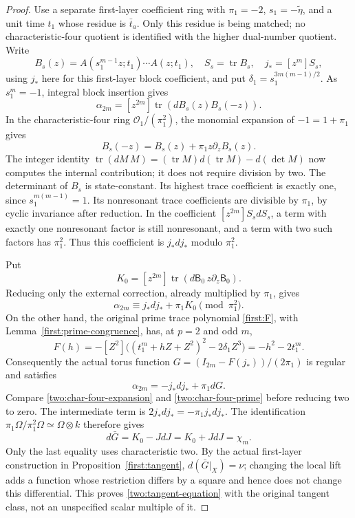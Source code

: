 \begin{proof}
Use a separate first-layer coefficient ring with
$\pi_1=-2$, $s_1=-\widetilde\eta$, and a unit time $t_1$
whose residue is $\bar t_a$. Only this residue is being
matched; no characteristic-four quotient is identified with
the higher dual-number quotient. Write
\[
 B_s(z)=A(s_1^{m-1}z;t_1)\cdots A(z;t_1),\quad
 S_s=\operatorname{tr}B_s,\quad j_*=[z^m]S_s,
\]
using $j_*$ here for this first-layer block coefficient, and put
$\delta_1=s_1^{3m(m-1)/2}$.
As $s_1^m=-1$, integral block insertion gives
\[
 \alpha_{2m}=[z^{2m}]\operatorname{tr}(dB_s(z)B_s(-z)).
\]
In the characteristic-four ring $\mathcal O_1/(\pi_1^2)$,
the monomial expansion of $-1=1+\pi_1$ gives
\[
 B_s(-z)=B_s(z)+\pi_1z\partial_zB_s(z).
\]
The integer identity
$\operatorname{tr}(dM\,M)=(\operatorname{tr}M)d(\operatorname{tr}M)
 -d(\det M)$ now computes the internal contribution; it
does not require division by two. The determinant of $B_s$
is state-constant. Its highest trace coefficient is exactly
one, since $s_1^{m(m-1)}=1$. Its nonresonant trace coefficients
are divisible by $\pi_1$, by cyclic invariance after reduction.
In the coefficient $[z^{2m}]S_s dS_s$, a term with exactly
one nonresonant factor is still nonresonant, and a term with
two such factors has $\pi_1^2$. Thus this coefficient is
$j_*dj_*$ modulo $\pi_1^2$.

Put
\[
 K_0=[z^{2m}]\operatorname{tr}
               (d\mathsf B_0\,z\partial_z\mathsf B_0).
\]
Reducing only the external correction, already multiplied by
$\pi_1$, gives
\begin{equation}
 \alpha_{2m}\equiv j_*dj_*+\pi_1K_0\pmod{\pi_1^2}.
 \label{two:char-four-expansion}
\end{equation}
On the other hand, the original prime trace polynomial
\eqref{first:F}, with Lemma~\ref{first:prime-congruence},
has, at $p=2$ and odd $m$,
\[
 F(h)=-[Z^2]\bigl((t_1^m+hZ+Z^2)^2-2\delta_1Z^3\bigr)
     =-h^2-2t_1^m.
\]
Consequently the actual torus function
$G=(I_{2m}-F(j_*))/(2\pi_1)$ is regular and satisfies
\begin{equation}
 \alpha_{2m}=-j_*dj_*+\pi_1dG.
 \label{two:char-four-prime}
\end{equation}
Compare \eqref{two:char-four-expansion} and
\eqref{two:char-four-prime} before reducing two to zero.
The intermediate term is
$2j_*dj_*=-\pi_1j_*dj_*$. The identification
$\pi_1\Omega/\pi_1^2\Omega\simeq\Omega\otimes k$
therefore gives
\[
 d\bar G=K_0-JdJ=K_0+JdJ=\chi_m.
\]
Only the last equality uses characteristic two. By the actual
first-layer construction in Proposition~\ref{first:tangent},
$d(\bar G|_X)=\nu$; changing the local lift adds a function
whose restriction differs by a square and hence does not
change this differential. This proves
\eqref{two:tangent-equation} with the original tangent class,
not an unspecified scalar multiple of it.
\end{proof}

